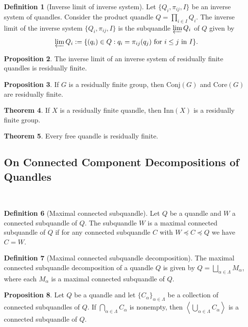 \documentclass[reqno,dvipsnames]{amsart}
\renewcommand{\l}{\left}
\renewcommand{\r}{\right}
\newcommand{\la}{\langle}
\newcommand{\ra}{\rangle}
\renewcommand{\a}{\alpha}
\renewcommand{\L}{\Lambda}
\renewcommand{\L}{\Lambda}
\newcommand{\Conj}{\text{Conj}}
\newcommand{\Core}{\text{Core}}
\newcommand{\Inn}{\text{Inn}}
\theoremstyle{definition}
\newtheorem{theorem}{Theorem}[section]
\newtheorem{proposition}[theorem]{Proposition}
\newtheorem{definition}[theorem]{Definition}
\begin{document}
\begin{definition}[Inverse limit of inverse system]
Let $\{Q_i,\pi_{ij},I\}$ be an inverse system of quandles. Consider the product quandle $Q=\prod_{i\in I}Q_i$. The inverse limit of the inverse system $\{Q_i,\pi_{ij},I\}$ is the subquandle $\varprojlim Q_i$ of $Q$ given by
\[\varprojlim Q_i:=\{(q_i)\in Q:q_i=\pi_{ij}(q_j)\text{ for $i\leq j$ in $I$}\}.\]
\end{definition}

\begin{proposition}
The inverse limit of an inverse system of residually finite quandles is residually finite.
\end{proposition}

\begin{proposition}
If $G$ is a residually finite group, then $\Conj(G)$ and $\Core(G)$ are residually finite.
\end{proposition}

\begin{theorem}
If $X$ is a residually finite quandle, then $\Inn(X)$ is a residually finite group.
\end{theorem}

\begin{theorem}
Every free quandle is residually finite.
\end{theorem}

\vspace{0.25in}

\subsection{On Connected Component Decompositions of Quandles}~\cite{iijima2017connected}

\begin{definition}[Maximal connected subquandle]
Let $Q$ be a quandle and $W$ a connected subquandle of $Q$. The subquandle $W$ is a maximal connected subquandle of $Q$ if for any connected subquandle $C$ with $W\preceq C\preceq Q$ we have $C=W$.
\end{definition}

\begin{definition}[Maximal connected subquandle decomposition]
The maximal connected subquandle decomposition of a quandle $Q$ is given by $Q=\bigsqcup_{\a\in\Lambda}M_\a$, where each $M_\a$ is a maximal connected subquandle of $Q$.
\end{definition}

\begin{proposition}
Let $Q$ be a quandle and let $\{C_\a\}_{\a\in\Lambda}$ be a collection of connected subquandles of $Q$. If $\bigcap_{\a\in\L}C_\a$ is nonempty, then $\l\la\bigcup_{\a\in\L}C_\a\r\ra$ is a connected subquandle of $Q$.
\end{proposition}
\end{document}
